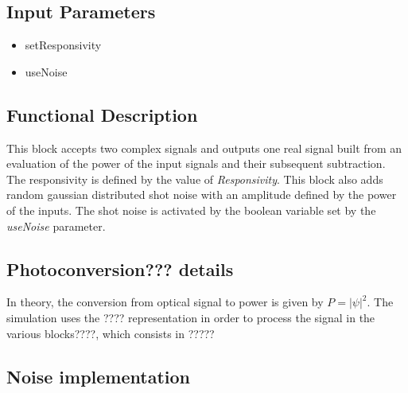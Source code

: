 \documentclass[../../sdf/tex/BPSK_system.tex]{subfiles}
\date{}
\begin{document}
\onlyinsubfile{\maketitle}

\subsection*{Input Parameters}

\begin{multicols}{2}
	\begin{itemize}
		\item setResponsivity
		\item useNoise
	\end{itemize}
\end{multicols}

\subsection*{Functional Description}

This block accepts two complex signals and outputs one real signal built from an evaluation of the power of the input signals and their subsequent subtraction. The responsivity is defined by the value of \textit{Responsivity}. This block also adds random gaussian distributed shot noise with an amplitude defined by the power of the inputs. The shot noise is activated by the boolean variable set by the \textit{useNoise} parameter.


\subsection*{Photoconversion??? details}

In theory, the conversion from optical signal to power is given by $P = |\psi|^2$. The simulation uses the ???? representation in order to process the signal in the various blocks????, which consists in ?????



\subsection*{Noise implementation}
\end{document}
